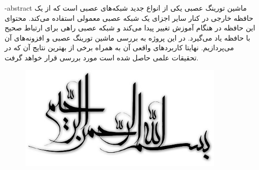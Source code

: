 \department{}

\fa-abstract{
ماشین تورینگ عصبی یکی از انواع جدید شبکه‌های عصبی است که از یک حافظه خارجی در کنار سایر اجزای یک شبکه عصبی معمولی استفاده می‌کند. محتوای این حافظه در هنگام آموزش تغییر پیدا می‌کند و شبکه عصبی راهی برای ارتباط صحیح با حافظه یاد می‌گیرد. در این پروژه به بررسی ماشین تورینگ عصبی و افزونه‌های آن می‌پردازیم. نهایتا کاربردهای واقعی آن به همراه برخی از بهترین نتایج آن که در تحقیقات علمی حاصل شده است مورد بررسی قرار خواهد گرفت.
}





\AUTtitle
\vspace*{7cm}
\thispagestyle{empty}
\begin{center}
\includegraphics[height=5cm,width=12cm]{besm}
\end{center}